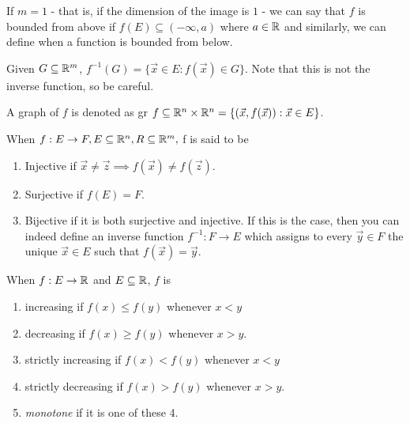\documentclass[11pt]{article}
\newcommand{\x}{\vec{x}}
\newcommand{\y}{\vec{y}}
\newcommand{\z}{\vec{z}}
\newcommand{\ra}{\rightarrow}
\newcommand{\sse}{\subseteq}
\begin{document}
\begin{definition}
    If $m = 1$ - that is, if the dimension of the image is $1$ - we can say that $f$ is bounded from above if $f(E) \subseteq (-\infty, a)$ where $a \in \mathbb{R}$ and similarly, we can define when a function is bounded from below.  
\end{definition}

\begin{definition}
    Given $G \subseteq \mathbb{R}^m$, $f^{-1}(G) = \{ \x \in E: f(\x) \in G\}$. Note that this is not the inverse function, so be careful.
\end{definition}

\begin{definition}[Graphs]
    A graph of $f$ is denoted as gr $f \subseteq \R^n \times \R^n = \{ (\x, f(\x)):\x \in E\}$.
\end{definition}

\begin{definition}[-jectivity]
    When $f: E \ra F, E \sse \R^n, R \sse \R^m,$ f is said to be \begin{enumerate}
        \item Injective if $\x \neq \z \implies f(\x) \neq f(\z)$.
        \item Surjective if $f(E) = F$.
        \item Bijective if it is both surjective and injective. If this is the case, then you can indeed define an inverse function $f^{-1} : F \ra E$ which assigns to every $\y \in F$ the unique $\x \in E$ such that $f(\x) = \y$.
    \end{enumerate}
\end{definition}

\begin{definition}[-creasing]
    When $f: E \ra \R$ and $E \sse \R$, $f$ is 
    \begin{enumerate}
        \item increasing if $f(x) \leq f(y)$ whenever $x < y$
        \item decreasing if $f(x) \geq f(y)$ whenever $x > y$.
        \item strictly increasing if $f(x) < f(y)$ whenever $x < y$
        \item strictly decreasing if $f(x) > f(y)$ whenever $x > y$.
        \item \textit{monotone} if it is one of these 4. 
    \end{enumerate}
\end{definition}
\end{document}
